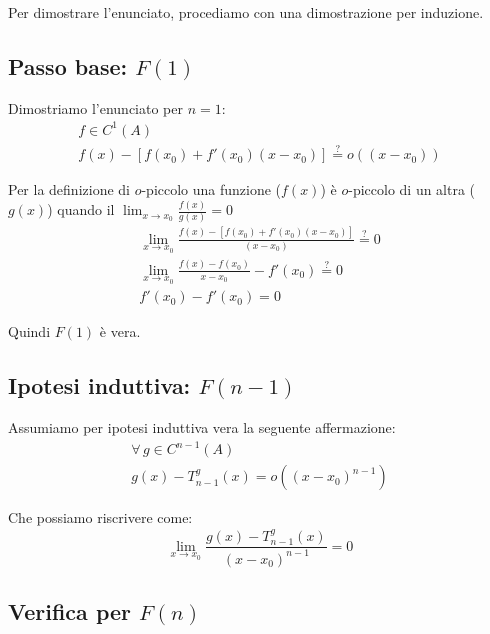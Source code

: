 \documentclass[../../dimostrazioni]{subfiles}
\begin{document}
            Per dimostrare l'enunciato, procediamo con una dimostrazione per induzione.

            \medskip

            \subsection*{Passo base: \(F(1)\)}

                Dimostriamo l'enunciato per \(n = 1\):
                \begin{gather*}
                    f \in C^1(A)\\
                    f(x) - \left[ f(x_0) + f'(x_0)(x-x_0) \right] \stackrel{?}{=}  o ((x-x_0))
                \end{gather*}

                Per la definizione di \(o\)-piccolo una funzione (\(f(x)\)) è \(o\)-piccolo di un altra (\(g(x)\)) quando il \( \lim_{x \to x_0} \frac{f(x)}{g(x)} = 0\) 
                \begin{gather*}
                    \lim_{x \to x_0} \frac{f(x) - \left[ f(x_0) + f'(x_0)(x-x_0) \right]}{(x-x_0)} \stackrel{?}{=} 0\\
                    \lim_{x \to x_0} \frac{f(x) - f(x_0)}{x - x_0} - f'(x_0) \stackrel{?}{=} 0\\
                    f'(x_0) - f'(x_0) = 0
                \end{gather*}

                Quindi \(F(1)\) è vera. 

            \subsection*{Ipotesi induttiva: \(F(n-1)\)}

                Assumiamo per ipotesi induttiva vera la seguente affermazione:
                \begin{gather*}
                    \forall \, g \in C^{n-1} (A)\\
                    g(x) - T _{n - 1} ^ g (x) = o ((x-x_0)^{n-1})
                \end{gather*}
                
                Che possiamo riscrivere come:
                \[  \lim_{x \to x_0} \frac{g(x) - T _{n - 1} ^ g (x)}{(x-x_0)^{n-1}} = 0 \]

            \subsection*{Verifica per \(F(n)\)}
\end{document}
